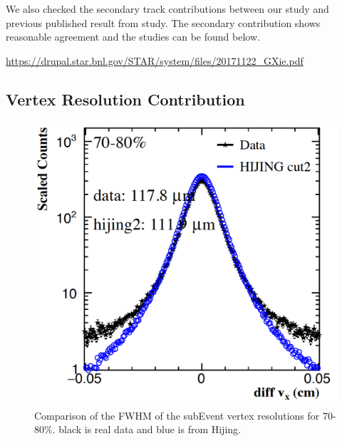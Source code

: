 We also checked the secondary track contributions between our study and previous published result from study. The secondary contribution shows reasonable agreement and the studies can be found below.

\url{https://drupal.star.bnl.gov/STAR/system/files/20171122_GXie.pdf}


\subsection{Vertex Resolution Contribution}
\label{concern2}

\begin{figure}[htbp]
\begin{minipage}[htbp]{0.47\linewidth}
\centering
\includegraphics[width=1.0\textwidth,angle=0]{figure/Run14_D0HFT/vtxX_70_80.png}
\caption{ Comparison of the FWHM of the subEvent vertex resolutions for 70-80\%. black is real data and blue is from Hijing. \label{vtxX_70_80}}
\end{minipage}
\hfill
\begin{minipage}[htbp]{0.47\linewidth}
\centering

\end{minipage}
\end{figure}
